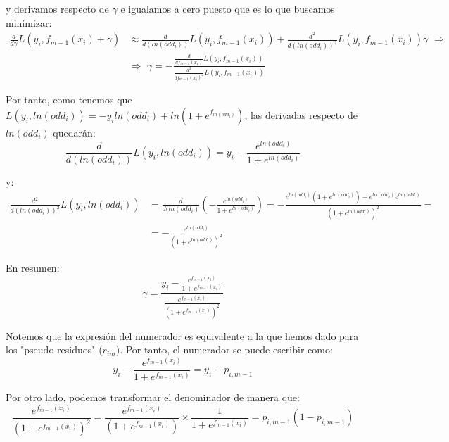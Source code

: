\documentclass[12pt,twoside]{article}
\begin{document}
\noindent
y derivamos respecto de $\gamma$ e igualamos a cero puesto que es lo que buscamos minimizar:
\begin{equation*}
\begin{split}
\frac{d}{d\gamma}L(y_i, f_{m-1}(x_i) + \gamma) &\approx \frac{d}{d(ln(odd_i))}L(y_i, f_{m-1}(x_i)) + \frac{d^2}{d(ln(odd_i))^2}L(y_i, f_{m-1}(x_i))\gamma \, \, \Rightarrow \\
& \Rightarrow \, \, \gamma = - \frac{\frac{d}{df_{m-1}(x_i)}L(y_i, f_{m-1}(x_i))}{\frac{d^2}{df_{m-1}(x_i)^2}L(y_i, f_{m-1}(x_i))}
\end{split}
\end{equation*}

Por tanto, como tenemos que $L(y_i, ln(odd_i)) = -y_iln(odd_i) + ln(1 + e^{f_{ln(odd_i)}})$, las derivadas respecto de $ln(odd_i)$ quedarán:
\begin{equation*}
\frac{d}{d(ln(odd_i))}L(y_i, ln(odd_i)) = y_i - \frac{e^{ln(odd_i)}}{1 + e^{ln(odd_i)}}
\end{equation*}

\noindent
y:
\begin{equation*}
\begin{split}
\frac{d^2}{d(ln(odd_i))^2}L(y_i, ln(odd_i)) &=\frac{d}{d(ln(odd_i)} \left( - \frac{e^{ln(odd_i)}}{1 + e^{ln(odd_i)}} \right) = - \frac{e^{ln(odd_i)}(1 + e^{ln(odd_i)}) - e^{ln(odd_i)}e^{ln(odd_i)}}{(1 + e^{ln(odd_i)})^2} = \\
&= - \frac{e^{ln(odd_i)}}{(1 + e^{ln(odd_i)})^2}
\end{split}
\end{equation*}

En resumen:
\begin{equation*}
\gamma = \frac{y_i - \frac{e^{f_{m-1}(x_i)}}{1 + e^{f_{m-1}(x_i)}}}{\frac{e^{f_{m-1}(x_i)}}{(1 + e^{f_{m-1}(x_i)})^2}}
\end{equation*}

Notemos que la expresión del numerador es equivalente a la que hemos dado para los "pseudo-residuos" ($r_{im}$). Por tanto, el numerador se puede escribir como:
\begin{equation*}
y_i - \frac{e^{f_{m-1}(x_i)}}{1 + e^{f_{m-1}(x_i)}} = y_i - p_{i, m-1}
\end{equation*}

Por otro lado, podemos transformar el denominador de manera que:
\begin{equation*}
\frac{e^{f_{m-1}(x_i)}}{(1 + e^{f_{m-1}(x_i)})^2} = \frac{e^{f_{m-1}(x_i)}}{(1 + e^{f_{m-1}(x_i)})} \times \frac{1}{1 + e^{f_{m-1}(x_i)}} = p_{i, m-1}(1 - p_{i, m-1})
\end{equation*}
\end{document}
